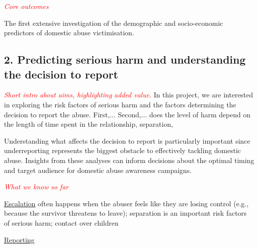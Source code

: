 \documentclass[11pt, a4paper]{article}
\begin{document}






\textcolor{red}{\textit{Core outcomes}} 

The first extensive investigation of the demographic and socio-economic predictors of domestic abuse victimisation.

\newpage


\subsection*{2. Predicting serious harm and understanding the decision to report}

 \textcolor{red}{\textit{Short intro about aims, highlighting added value.}} In this project, we are interested in exploring the risk factors of serious harm and the factors determining the decision to report the abuse. First,...
 Second,...
 does the level of harm depend on the length of time spent in the relationship, separation, 

Understanding what affects the decision to report is particularly important since underreporting represents the biggest obstacle to effectively tackling domestic abuse.
 Insights from these analyses can inform decisions about the optimal timing and target audience for domestic abuse awareness campaigns.

\textcolor{red}{\textit{What we know so far}}

\href{https://www.thehotline.org/2018/09/28/escalation/}{Escalation} often happens when the abuser feels like they are losing control (e.g., because the survivor threatens to leave); separation is an important risk factors of serious harm; contact over children

\href{http://www.safelives.org.uk/policy-evidence/about-domestic-abuse/how-long-do-people-live-domestic-abuse-and-when-do-they-get}{Reporting} 
\end{document}
